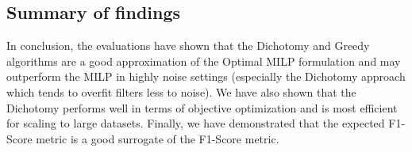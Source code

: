 






\subsection{Summary of findings}
In conclusion, the evaluations have shown that the Dichotomy and Greedy algorithms are a good approximation of the Optimal MILP formulation and may outperform the MILP in highly noise settings (especially the Dichotomy approach which tends to overfit filters less to noise). We have also shown that the Dichotomy performs well in terms of objective optimization and is most efficient for scaling to large datasets. Finally, we have demonstrated that the expected F1-Score metric is a good surrogate of the F1-Score metric.

























